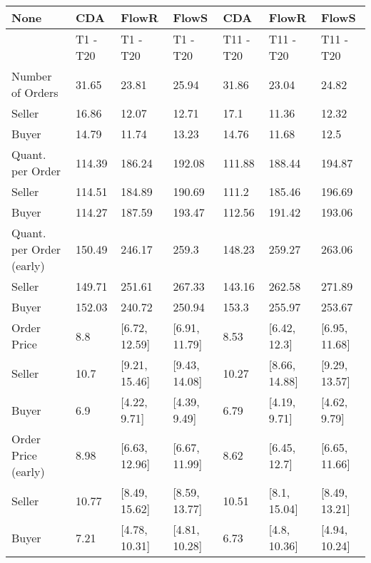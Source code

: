 \begin{tabular}{lllllll}
\hline
 None                     & CDA      & FlowR         & FlowS         & CDA       & FlowR         & FlowS         \\
\hline
                          & T1 - T20 & T1 - T20      & T1 - T20      & T11 - T20 & T11 - T20     & T11 - T20     \\
 Number of Orders         & 31.65    & 23.81         & 25.94         & 31.86     & 23.04         & 24.82         \\
 Seller                   & 16.86    & 12.07         & 12.71         & 17.1      & 11.36         & 12.32         \\
 Buyer                    & 14.79    & 11.74         & 13.23         & 14.76     & 11.68         & 12.5          \\
 Quant. per Order         & 114.39   & 186.24        & 192.08        & 111.88    & 188.44        & 194.87        \\
 Seller                   & 114.51   & 184.89        & 190.69        & 111.2     & 185.46        & 196.69        \\
 Buyer                    & 114.27   & 187.59        & 193.47        & 112.56    & 191.42        & 193.06        \\
 Quant. per Order (early) & 150.49   & 246.17        & 259.3         & 148.23    & 259.27        & 263.06        \\
 Seller                   & 149.71   & 251.61        & 267.33        & 143.16    & 262.58        & 271.89        \\
 Buyer                    & 152.03   & 240.72        & 250.94        & 153.3     & 255.97        & 253.67        \\
 Order Price              & 8.8      & [6.72, 12.59] & [6.91, 11.79] & 8.53      & [6.42, 12.3]  & [6.95, 11.68] \\
 Seller                   & 10.7     & [9.21, 15.46] & [9.43, 14.08] & 10.27     & [8.66, 14.88] & [9.29, 13.57] \\
 Buyer                    & 6.9      & [4.22, 9.71]  & [4.39, 9.49]  & 6.79      & [4.19, 9.71]  & [4.62, 9.79]  \\
 Order Price (early)      & 8.98     & [6.63, 12.96] & [6.67, 11.99] & 8.62      & [6.45, 12.7]  & [6.65, 11.66] \\
 Seller                   & 10.77    & [8.49, 15.62] & [8.59, 13.77] & 10.51     & [8.1, 15.04]  & [8.49, 13.21] \\
 Buyer                    & 7.21     & [4.78, 10.31] & [4.81, 10.28] & 6.73      & [4.8, 10.36]  & [4.94, 10.24] \\

\end{tabular}
